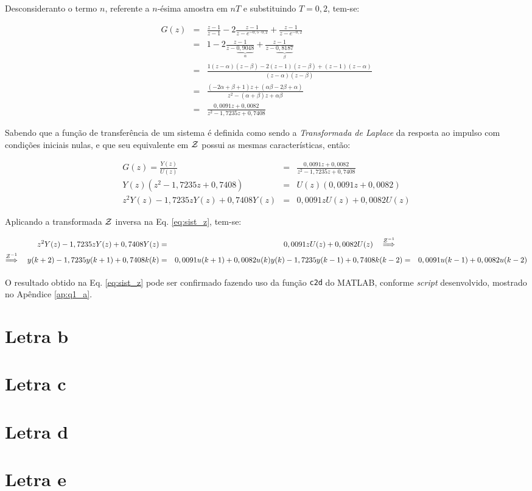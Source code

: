 Desconsideranto o termo $n$, referente a $n$-ésima amostra em $nT$ e
substituindo $T = 0,2$, tem-se:

\begin{eqnarray}
G(z) & = & \frac{z-1}{z-1} - 
           2\frac{z-1}{z-e^{-0,5 \cdotp 0,2}} + 
           \frac{z-1}{z-e^{-0,2}}\nonumber\\
& = & 1 - 
      2\frac{z-1}{z-\underbrace{0,9048}_{\alpha}} + 
      \frac{z-1}{z-\underbrace{0,8187}_{\beta}}\nonumber\\
& = & \frac{1(z-\alpha)(z-\beta)-2(z-1)(z-\beta)+(z-1)(z-\alpha)}
           {(z-\alpha)(z-\beta)}\nonumber\\
& = & \frac{(-2\alpha + \beta + 1)z + (\alpha\beta - 2\beta + \alpha)}
           {z^2 - (\alpha+\beta)z + \alpha\beta}\nonumber\\
& = & \frac{0,0091z + 0,0082}{z^2 - 1,7235z + 0,7408}
\end{eqnarray}

Sabendo que a função de transferência de um sistema é definida como sendo a {\it
Transformada de Laplace} da resposta ao impulso com condições iniciais nulas, e
que seu equivalente em $\mathcal{Z}$ possui as mesmas características, então:

\begin{eqnarray}
G(z) = \frac{Y(z)}{U(z)} & = & \frac{0,0091z + 0,0082}
                                    {z^2 - 1,7235z + 0,7408}\nonumber\\
Y(z)(z^2 - 1,7235z + 0,7408) & = & U(z)(0,0091z + 0,0082)\nonumber\\
z^2Y(z) - 1,7235zY(z) + 0,7408Y(z) & = & 0,0091zU(z) +
                                        0,0082U(z)\label{eq:sist_z}
\end{eqnarray}

Aplicando a transformada $\mathcal{Z}$ inversa na Eq. \ref{eq:sist_z}, tem-se:

\begin{eqnarray}
z^2Y(z) - 1,7235zY(z) + 0,7408Y(z) & = & 0,0091zU(z) + 0,0082U(z)
\quad\stackrel{\mathcal{Z}^{-1}}{\Longrightarrow}\quad\nonumber\\
\stackrel{\mathcal{Z}^{-1}}{\Longrightarrow}\quad
y(k+2) - 1,7235y(k+1) + 0,7408k(k) & = & 
0,0091u(k+1) + 0,0082u(k)\nonumber
y(k) - 1,7235y(k-1) + 0,7408k(k-2) & = & 0,0091u(k-1) + 0,0082u(k-2)\nonumber
\end{eqnarray}

O resultado obtido na Eq. \ref{eq:sist_z} pode ser confirmado fazendo uso da
função {\tt c2d} do MATLAB\textsuperscript{\textregistered}, conforme {\it
script} desenvolvido, mostrado no Apêndice \ref{ap:q1_a}.

\section*{Letra b}
\section*{Letra c}
\section*{Letra d}
\section*{Letra e}
